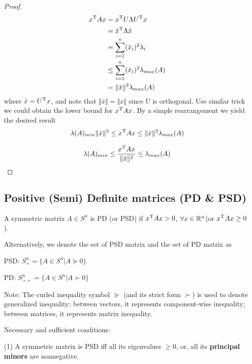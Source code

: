 \begin{proof}
	\begin{align*}
	x^{{\rm T}}Ax &= x^{{\rm T}}U\Lambda U^{{\rm T}}x\\
	&= \bar{x}^{{\rm T}}\Lambda\bar{x}\\
	&= \sum^n_{i=1}(\bar{x}_i)^2\lambda_i\\
	&\leq \sum^n_{i=1}(\bar{x}_i)^2\lambda_{max}(A)\\
	&= \Vert\bar{x}\Vert^2\lambda_{max}(A)
	\end{align*}
where $\bar{x}=U^{{\rm T}}x$, and note that $\Vert \bar{x}\Vert = \Vert {x}\Vert$ since $U$ is orthogonal. Use similar trick we could obtain the lower bound for $x^{{\rm T}}Ax$. By a simple rearrangement we yield the desired result
	\begin{equation*}
	\lambda(A)_{min}\Vert\bar{x}\Vert^2 \leq x^{{\rm T}}Ax \leq \Vert\bar{x}\Vert^2\lambda_{max}(A)
	\end{equation*}
	
	\begin{equation*}
	\lambda(A)_{min} \leq \frac{x^{{\rm T}}Ax}{\Vert\bar{x}\Vert^2} \leq \lambda_{max}(A)
	\end{equation*}
\end{proof}


\subsection{Positive (Semi) Definite matrices (PD \& PSD)}

\begin{definition}
	A symmetric matrix $A\in S^n$ is PD (or PSD) if $x^{{\rm T}}Ax > 0$, $\forall x\in \mathbb{R}^n$(or $x^{{\rm T}}Ax\geq 0$).
\end{definition}

Alternatively, we denote the set of PSD matrix and the set of PD matrix as

PSD: $S^n_{+} = \{A\in S^n \vert A\succeq 0\}$

PD: $S^n_{++} = \{A\in S^n \vert A\succ 0\}$

Note: The curled inequality symbol $\succeq$ (and its strict form $\succ$) is used to denote generalized inequality: between vectors, it represents component-wise inequality; between matrices, it represents matrix inequality.

\vspace{0.3cm}
Necessary and sufficient conditions:

(1) A symmetric matrix is PSD iff all its eigenvalues $\geq 0$, or, all its \textbf{principal minors} are nonnegative.

